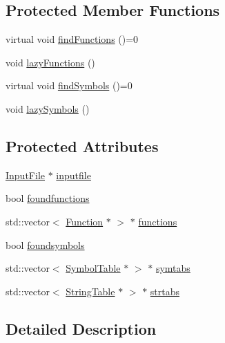 \subsection*{\-Protected \-Member \-Functions}
\begin{DoxyCompactItemize}
\item 
virtual void \hyperlink{class_e_p_a_x_1_1_base_binary_abcd76218158ab20a2f81d68a537b21cb}{find\-Functions} ()=0
\item 
void \hyperlink{class_e_p_a_x_1_1_base_binary_ad41eddf1063ab540878c90f788428aea}{lazy\-Functions} ()
\item 
virtual void \hyperlink{class_e_p_a_x_1_1_base_binary_adc22abd64f6a873fbce30c79508322fe}{find\-Symbols} ()=0
\item 
void \hyperlink{class_e_p_a_x_1_1_base_binary_aabbaef763d108e78d0d29c3bedbc0d35}{lazy\-Symbols} ()
\end{DoxyCompactItemize}
\subsection*{\-Protected \-Attributes}
\begin{DoxyCompactItemize}
\item 
\hyperlink{class_e_p_a_x_1_1_input_file}{\-Input\-File} $\ast$ \hyperlink{class_e_p_a_x_1_1_base_binary_a9e75692a1d1b71186a49dd77d8b74a65}{inputfile}
\item 
bool \hyperlink{class_e_p_a_x_1_1_base_binary_a3c83e522df1f2d99e5e0f81d7cd36fcc}{foundfunctions}
\item 
std\-::vector$<$ \hyperlink{class_e_p_a_x_1_1_function}{\-Function} $\ast$ $>$ $\ast$ \hyperlink{class_e_p_a_x_1_1_base_binary_aa26b782267daf58809b05047ff677a3e}{functions}
\item 
bool \hyperlink{class_e_p_a_x_1_1_base_binary_a941c0d2bd1b8fa811d8a516c603685af}{foundsymbols}
\item 
std\-::vector$<$ \hyperlink{class_e_p_a_x_1_1_symbol_table}{\-Symbol\-Table} $\ast$ $>$ $\ast$ \hyperlink{class_e_p_a_x_1_1_base_binary_ab2b5f8e146dba5f2f0ff32e34b6712bd}{symtabs}
\item 
std\-::vector$<$ \hyperlink{class_e_p_a_x_1_1_string_table}{\-String\-Table} $\ast$ $>$ $\ast$ \hyperlink{class_e_p_a_x_1_1_base_binary_a48e7fd1954b46f6bf7885dd70ae0ac78}{strtabs}
\end{DoxyCompactItemize}


\subsection{\-Detailed \-Description}


